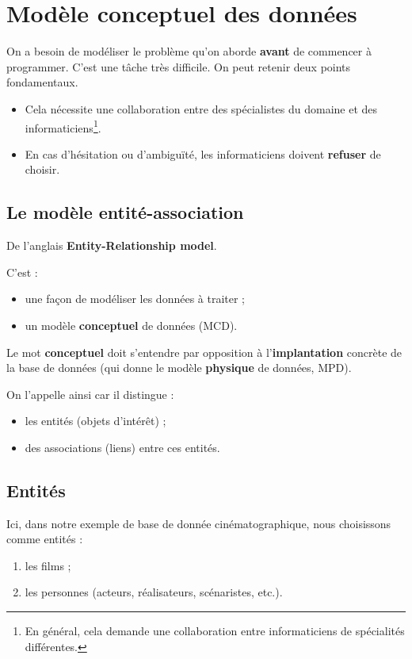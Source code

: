 \section{Modèle conceptuel des données}

On a besoin de modéliser le problème qu'on aborde \textbf{avant} de commencer à programmer.
C'est une tâche très difficile. On peut retenir deux points fondamentaux. 
\begin{itemize}
\item Cela nécessite une collaboration entre des spécialistes du domaine et des informaticiens\footnote{En
    général, cela demande une collaboration entre informaticiens de
    spécialités différentes.}.
\item En cas d'hésitation ou d'ambiguïté, les informaticiens doivent \textbf{refuser} de choisir.
\end{itemize}

\subsection{Le modèle entité-association}
De l'anglais \textbf{Entity-Relationship model}. 

C'est :
\begin{itemize}
\item une façon de  modéliser les  données à traiter ;
\item un modèle \textbf{conceptuel} de  données (MCD).
\end{itemize}
Le mot \textbf{conceptuel} doit s'entendre par opposition à  l'\textbf{implantation} concrète de la base de données (qui donne le modèle \textbf{physique} de données, MPD).

On l'appelle ainsi car il distingue :
\begin{itemize}
\item les entités (objets d'intérêt) ;
\item des associations (liens) entre ces entités.
\end{itemize}
\subsection{Entités}
Ici, dans notre exemple de base de donnée cinématographique, nous choisissons comme entités :
  \begin{enumerate}
  \item les films ;
  \item les personnes (acteurs, réalisateurs, scénaristes, etc.).
  \end{enumerate}

